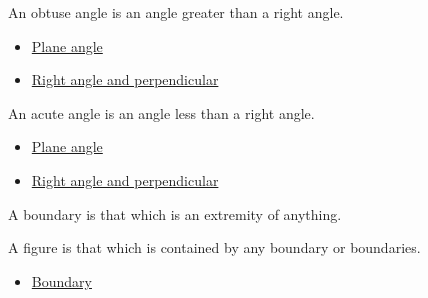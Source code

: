 \begin{definition}
\label{def:euclid-obtuse-angle}
An obtuse angle is an angle greater than a right angle.
\end{definition}
\begin{lra-not-visible}
\begin{dependencies}
\begin{itemize}
  \item \hyperref[def:euclid-plane-angle]{Plane angle}
  \item \hyperref[def:euclid-right-angle-and-perpendicular]{Right angle and perpendicular}
\end{itemize}
\end{dependencies}
\end{lra-not-visible}

\begin{definition}
\label{def:euclid-acute-angle}
An acute angle is an angle less than a right angle.
\end{definition}
\begin{lra-not-visible}
\begin{dependencies}
\begin{itemize}
  \item \hyperref[def:euclid-plane-angle]{Plane angle}
  \item \hyperref[def:euclid-right-angle-and-perpendicular]{Right angle and perpendicular}
\end{itemize}
\end{dependencies}
\end{lra-not-visible}

\begin{definition}[Boundary]
\label{def:euclid-boundary}
A boundary is that which is an extremity of anything.
\end{definition}
\begin{lra-not-visible}
\NoLocalDependencies
\end{lra-not-visible}

\begin{definition}[Figure]
\label{def:euclid-figure}
A figure is that which is contained by any boundary or boundaries.
\end{definition}
\begin{lra-not-visible}
\begin{dependencies}
\begin{itemize}
  \item \hyperref[def:euclid-boundary]{Boundary}
\end{itemize}
\end{dependencies}
\end{lra-not-visible}

